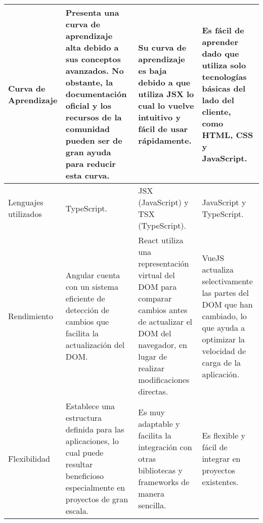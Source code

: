 \begin{longtable}{|p{2.5cm}|p{3cm}|p{3cm}|p{3cm}|}
    Curva de Aprendizaje                           & Presenta una curva de aprendizaje alta debido a sus conceptos avanzados. No obstante, la documentación oficial y los recursos de la comunidad pueden ser de gran ayuda para reducir esta curva. & Su curva de aprendizaje es baja debido a que utiliza JSX lo cual lo vuelve intuitivo y fácil de usar rápidamente.                                              & Es fácil de aprender dado que utiliza solo tecnologías básicas del lado del cliente, como HTML, CSS y JavaScript.                              \\\hline
    Lenguajes utilizados                           & TypeScript.                                                                                                                                                                                     & JSX (JavaScript) y TSX (TypeScript).                                                                                                                           & JavaScript y TypeScript.                                                                                                                       \\\hline
    Rendimiento                                    & Angular cuenta con un sistema eficiente de detección de cambios que facilita la actualización del DOM.                                                                                          & React utiliza una representación virtual del DOM para comparar cambios antes de actualizar el DOM del navegador, en lugar de realizar modificaciones directas. & VueJS actualiza selectivamente las partes del DOM que han cambiado, lo que ayuda a optimizar la velocidad de carga de la aplicación.           \\\hline
    Flexibilidad                                   & Establece una estructura definida para las aplicaciones, lo cual puede resultar beneficioso especialmente en proyectos de gran escala.                                                          & Es muy adaptable y facilita la integración con otras bibliotecas y frameworks de manera sencilla.                                                              & Es flexible y fácil de integrar en proyectos existentes.                                                                                       \\
\end{longtable}